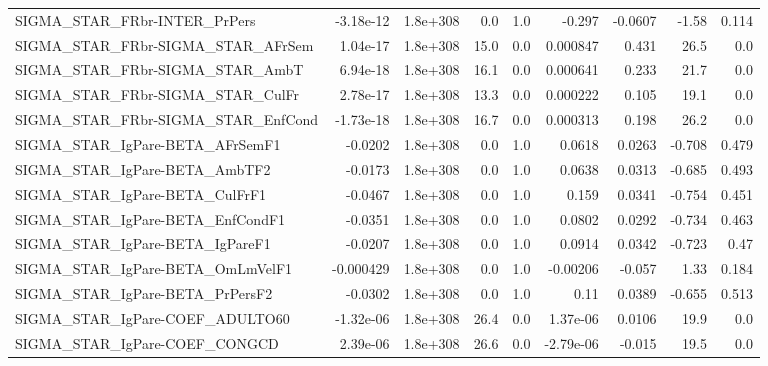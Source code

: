 \begin{tabular}{lrrrrrrrr}
SIGMA\_STAR\_FRbr-INTER\_PrPers          &   -3.18e-12 &     1.8e+308 &     0.0 &      1.0 &     -0.297 &     -0.0607 &        -1.58 &         0.114 \\
SIGMA\_STAR\_FRbr-SIGMA\_STAR\_AFrSem     &    1.04e-17 &     1.8e+308 &    15.0 &      0.0 &   0.000847 &       0.431 &         26.5 &           0.0 \\
SIGMA\_STAR\_FRbr-SIGMA\_STAR\_AmbT       &    6.94e-18 &     1.8e+308 &    16.1 &      0.0 &   0.000641 &       0.233 &         21.7 &           0.0 \\
SIGMA\_STAR\_FRbr-SIGMA\_STAR\_CulFr      &    2.78e-17 &     1.8e+308 &    13.3 &      0.0 &   0.000222 &       0.105 &         19.1 &           0.0 \\
SIGMA\_STAR\_FRbr-SIGMA\_STAR\_EnfCond    &   -1.73e-18 &     1.8e+308 &    16.7 &      0.0 &   0.000313 &       0.198 &         26.2 &           0.0 \\
SIGMA\_STAR\_IgPare-BETA\_AFrSemF1       &     -0.0202 &     1.8e+308 &     0.0 &      1.0 &     0.0618 &      0.0263 &       -0.708 &         0.479 \\
SIGMA\_STAR\_IgPare-BETA\_AmbTF2         &     -0.0173 &     1.8e+308 &     0.0 &      1.0 &     0.0638 &      0.0313 &       -0.685 &         0.493 \\
SIGMA\_STAR\_IgPare-BETA\_CulFrF1        &     -0.0467 &     1.8e+308 &     0.0 &      1.0 &      0.159 &      0.0341 &       -0.754 &         0.451 \\
SIGMA\_STAR\_IgPare-BETA\_EnfCondF1      &     -0.0351 &     1.8e+308 &     0.0 &      1.0 &     0.0802 &      0.0292 &       -0.734 &         0.463 \\
SIGMA\_STAR\_IgPare-BETA\_IgPareF1       &     -0.0207 &     1.8e+308 &     0.0 &      1.0 &     0.0914 &      0.0342 &       -0.723 &          0.47 \\
SIGMA\_STAR\_IgPare-BETA\_OmLmVelF1      &   -0.000429 &     1.8e+308 &     0.0 &      1.0 &   -0.00206 &      -0.057 &         1.33 &         0.184 \\
SIGMA\_STAR\_IgPare-BETA\_PrPersF2       &     -0.0302 &     1.8e+308 &     0.0 &      1.0 &       0.11 &      0.0389 &       -0.655 &         0.513 \\
SIGMA\_STAR\_IgPare-COEF\_ADULTO60       &   -1.32e-06 &     1.8e+308 &    26.4 &      0.0 &   1.37e-06 &      0.0106 &         19.9 &           0.0 \\
SIGMA\_STAR\_IgPare-COEF\_CONGCD         &    2.39e-06 &     1.8e+308 &    26.6 &      0.0 &  -2.79e-06 &      -0.015 &         19.5 &           0.0 \\

\end{tabular}
